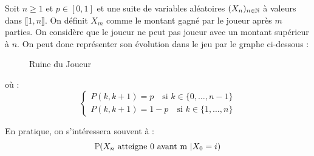 \begin{example}
    Soit $n \geqslant 1$ et $p \in [0,1]$ et une suite de variables aléatoires $(X_n)_{n \in \mathbb{N}}$ 
    à valeurs dans $ \llbracket 1, n \rrbracket$. 
    On définit $X_m$ comme le montant gagné par le joueur après $m$ parties. 
    On considère que le joueur ne peut pas joueur avec un montant supérieur à $n$.
    On peut donc représenter son évolution dans le jeu par le graphe ci-dessous :

        \begin{figure}[h!]
            \centering
            \caption{Ruine du Joueur}
        \end{figure}

    où :
        \[
            \begin{cases}
                P(k, k+1) = p \quad \text{si } k \in \{0,\dots, n-1\} \\ 
                P(k,k+1) = 1-p \quad \text{si } k \in \{1, \dots, n\} 
            \end{cases}
        \]

    En pratique, on s'intéressera souvent à : 
        \[ \mathbb{P}(X_n \text{ atteigne 0 avant m } | X_0 = i) \] 
\end{example}

